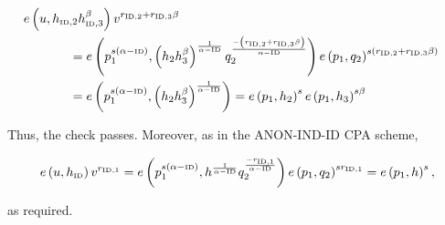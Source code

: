\documentclass[11pt]{article}
\begin{document}
\begin{equation*}
 \begin{split}
  e \left( u, h_{\textrm{\tiny{ID}},2} h_{\textrm{\tiny{ID}},3}^{\beta} \right) v^{ r_{\textrm{\tiny{ID}},2} + r_{\textrm{\tiny{ID}},3} \beta} \\
  & \negthickspace \negthickspace \negthickspace \negthickspace \negthickspace \negthickspace \negthickspace \negthickspace \negthickspace \negthickspace \negthickspace \negthickspace \negthickspace \negthickspace \negthickspace \negthickspace\negthickspace \negthickspace \negthickspace \negthickspace \negthickspace \negthickspace \negthickspace \negthickspace \negthickspace \negthickspace \negthickspace \negthickspace \negthickspace \negthickspace \negthickspace = e \left( p_1^{s\left( \alpha - \textrm{\tiny{ID}} \right)}, \left( h_{2}h_{3}^{\beta} \right)^{\frac{1}{\alpha - \textrm{\tiny{ID}}}} q_2^{\frac{- \left( r_{\textrm{\tiny{ID}},2} + r_{\textrm{\tiny{ID}},3} \beta \right)}{\alpha - \textrm{\tiny{ID}}}} \right) e \left( p_1, q_2 \right)^{s \left( r_{\textrm{\tiny{ID}},2} + r_{\textrm{\tiny{ID}},3} \beta \right)} \\
 & \negthickspace \negthickspace \negthickspace \negthickspace \negthickspace \negthickspace \negthickspace \negthickspace \negthickspace \negthickspace \negthickspace \negthickspace \negthickspace \negthickspace \negthickspace \negthickspace \negthickspace \negthickspace \negthickspace \negthickspace \negthickspace \negthickspace \negthickspace \negthickspace \negthickspace \negthickspace \negthickspace \negthickspace \negthickspace \negthickspace \negthickspace = e \left( p_1^{s\left( \alpha - \textrm{\tiny{ID}} \right)}, \left( h_{2}h_{3}^{\beta} \right)^{\frac{1}{\alpha - \textrm{\tiny{ID}}}} \right) = e \left( p_1, h_2 \right)^s e \left( p_1, h_3\right)^{s \beta}
 \end{split}
\end{equation*}


Thus, the check passes. Moreover, as in the ANON-IND-ID CPA scheme,

\begin{equation*}
 e \left( u, h_{\textrm{\tiny{ID}}} \right) v^{r_{ \textrm{\tiny{ID}},1}} = e \left( p_1^{s\left( \alpha - \textrm{\tiny{ID}} \right)}, h^{\frac{1}{\alpha - \textrm{\tiny{ID}}}} q_2^{\frac{- r_{\textrm{\tiny{ID}},1}}{\alpha - \textrm{\tiny{ID}}}} \right) e \left( p_1, q_2 \right)^{s r_{\textrm{\tiny{ID}},1}} = e \left( p_1, h\right)^s,
\end{equation*}

as required.
\end{document}
